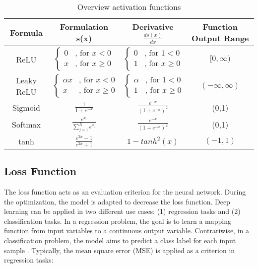 \begin {table}[H]
\begin{tabular}{ c c c c }
\toprule 
Formula & Formulation s(x) & Derivative $\frac{ds(x)}{dx}$ & Function Output Range \\
\midrule 
ReLU &   $\begin{cases} 0 & \text{, for }x < 0\\
	x & \text{, for }x \geqslant 0 \end{cases}$ & $\begin{cases} 0 & \text{, for }1 < 0\\
	1 & \text{, for }x \geqslant 0 \end{cases}$ & $[ 0, \infty)$\\

\rule{0pt}{5ex}%

Leaky ReLU &   $\begin{cases} \alpha x & \text{, for }x < 0\\
	x & \text{, for }x \geqslant 0 \end{cases}$ & $\begin{cases} \alpha & \text{, for }1 < 0\\
	1 & \text{, for }x \geqslant 0 \end{cases}$ & $(- \infty, \infty)$\\

\rule{0pt}{5ex}%

Sigmoid & $\frac{1}{1+e^{-x}}$ & $\frac{e^{-x}}{(1+e^{-x})^{2}}$ & (0,1)\\

\rule{0pt}{5ex}%

Softmax & $\frac{e^{x_{i}}}{\sum_{j=1}^{K} e^{x_{j}}}$ & $\frac{e^{-x}}{(1+e^{-x})^{2}}$ & (0,1)\\

\rule{0pt}{5ex}%

tanh & $\frac{e^{2x}-1}{e^{2x}+1}$ & $1-tanh^{2}(x)$ & $(-1,1)$ \\
\bottomrule  

\end{tabular}
\caption {Overview activation functions \cite{ShilohPerl2020}} \label{tab:activation_functions}
\end {table}


\subsection{Loss Function}
The loss function acts as an evaluation criterion for the neural network. During the optimization, the model is adapted to decrease the loss function. Deep learning can be applied in two different use cases: (1) regression tasks and (2) classification tasks. In a regression problem, the goal is to learn a mapping function from input variables to a continuous output variable. Contrariwise, in a classification problem, the model aims to predict a class label for each input sample \cite{ShilohPerl2020}. Typically, the mean square error (MSE) is applied as a criterion in regression tasks:


